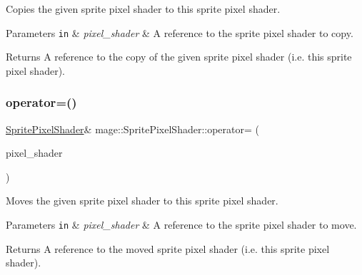 Copies the given sprite pixel shader to this sprite pixel shader.


\begin{DoxyParams}[1]{Parameters}
\mbox{\tt in}  & {\em pixel\+\_\+shader} & A reference to the sprite pixel shader to copy. \\
\hline
\end{DoxyParams}
\begin{DoxyReturn}{Returns}
A reference to the copy of the given sprite pixel shader (i.\+e. this sprite pixel shader). 
\end{DoxyReturn}
\hypertarget{classmage_1_1_sprite_pixel_shader_ad982c266c5ba3510009a3f5e7519e284}{}\label{classmage_1_1_sprite_pixel_shader_ad982c266c5ba3510009a3f5e7519e284} 
\subsubsection{\texorpdfstring{operator=()}{operator=()}\hspace{0.1cm}{\footnotesize\ttfamily [2/2]}}
{\footnotesize\ttfamily \hyperlink{classmage_1_1_sprite_pixel_shader}{Sprite\+Pixel\+Shader}\& mage\+::\+Sprite\+Pixel\+Shader\+::operator= (\begin{DoxyParamCaption}\item[{\hyperlink{classmage_1_1_sprite_pixel_shader}{Sprite\+Pixel\+Shader} \&\&}]{pixel\+\_\+shader }\end{DoxyParamCaption})\hspace{0.3cm}{\ttfamily [delete]}}

Moves the given sprite pixel shader to this sprite pixel shader.


\begin{DoxyParams}[1]{Parameters}
\mbox{\tt in}  & {\em pixel\+\_\+shader} & A reference to the sprite pixel shader to move. \\
\hline
\end{DoxyParams}
\begin{DoxyReturn}{Returns}
A reference to the moved sprite pixel shader (i.\+e. this sprite pixel shader). 
\end{DoxyReturn}
\hypertarget{classmage_1_1_sprite_pixel_shader_a8c0c4daf36c74822a772b1a38e8d876a}{}\label{classmage_1_1_sprite_pixel_shader_a8c0c4daf36c74822a772b1a38e8d876a} 
